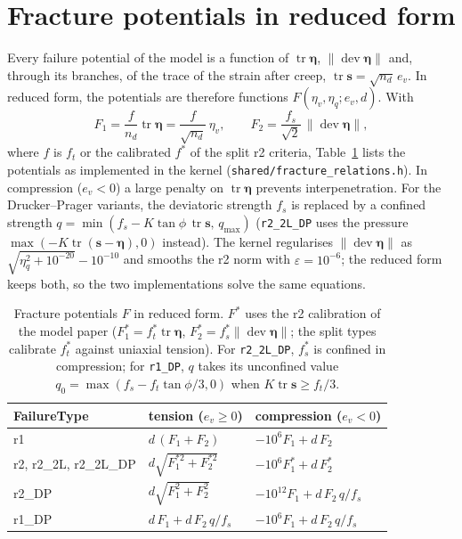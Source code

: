 \documentclass[11pt,a4paper]{article}
\newcommand{\bfeta}{\bm{\eta}}
\newcommand{\tr}{\operatorname{tr}}
\newcommand{\dev}{\operatorname{dev}}
\begin{document}
\section{Fracture potentials in reduced form}

Every failure potential of the model is a function of $\tr\bfeta$, $\|\dev\bfeta\|$ and, through
its branches, of the trace of the strain after creep, $\tr\bm{s}=\sqrt{n_d}\,e_v$. In reduced
form, the potentials are therefore functions $F(\eta_v,\eta_q;e_v,d)$. With
\begin{equation}
  F_1=\frac{f}{n_d}\tr\bfeta=\frac{f}{\sqrt{n_d}}\,\eta_v,\qquad
  F_2=\frac{f_s}{\sqrt2}\,\|\dev\bfeta\|,
\end{equation}
where $f$ is $f_t$ or the calibrated $f^*$ of the split r2 criteria, Table~\ref{tab:F} lists the
potentials as implemented in the kernel (\texttt{shared/fracture\_relations.h}). In compression
($e_v<0$) a large penalty on $\tr\bfeta$ prevents interpenetration. For the Drucker--Prager
variants, the deviatoric strength $f_s$ is replaced by a confined strength
$q=\min(f_s-K\tan\phi\,\tr\bm{s},\,q_\mathrm{max})$ (\texttt{r2\_2L\_DP} uses the pressure
$\max(-K\tr(\bm{s}-\bfeta),0)$ instead). The kernel regularises
$\|\dev\bfeta\|$ as $\sqrt{\eta_q^2+10^{-20}}-10^{-10}$ and smooths the r2 norm with
$\varepsilon=10^{-6}$; the reduced form keeps both, so the two implementations solve the same
equations.

\begin{table}[ht]
  \centering
  \small
  \begin{tabular}{>{\ttfamily}l l l}
    \toprule
    \textrm{FailureType} & tension ($e_v\geq0$) & compression ($e_v<0$) \\
    \midrule
    r1 & $d\,(F_1+F_2)$ & $-10^6F_1+d\,F_2$ \\
    r2, r2\_2L, r2\_2L\_DP & $d\sqrt{F_1^{*2}+F_2^{*2}}$ & $-10^6F_1^*+d\,F_2^*$ \\
    r2\_DP & $d\sqrt{F_1^2+F_2^2}$ & $-10^{12}F_1+d\,F_2\,q/f_s$ \\
    r1\_DP & $d\,F_1+d\,F_2\,q/f_s$ & $-10^6F_1+d\,F_2\,q/f_s$ \\
    \bottomrule
  \end{tabular}
  \caption{Fracture potentials $F$ in reduced form. $F^*$ uses the r2 calibration of the model
  paper ($F_1^*=f_t^*\tr\bfeta$, $F_2^*=f_s^*\|\dev\bfeta\|$; the split types calibrate $f_t^*$
  against uniaxial tension). For \texttt{r2\_2L\_DP}, $f_s^*$ is confined in compression; for
  \texttt{r1\_DP}, $q$ takes its unconfined value $q_0=\max(f_s-f_t\tan\phi/3,0)$ when
  $K\tr\bm{s}\geq f_t/3$.}
  \label{tab:F}
\end{table}
\end{document}
